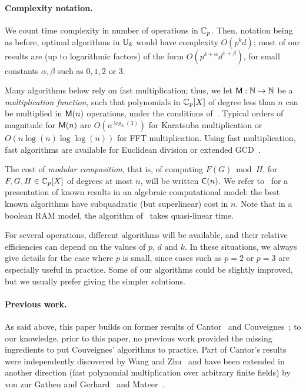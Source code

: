 \paragraph*{\bf Complexity notation.} We count time complexity
in number of operations in $\mathbb{C}_p$. Then, notation being as before,
optimal algorithms in $\mathbb{U}_k$ would have complexity $O(p^kd)$; most of
our results are (up to logarithmic factors) of the form
$O(p^{k+\alpha} d^{1+\beta})$, for small constants $\alpha,\beta$ such as
$0,1,2$ or $3$.

Many algorithms below rely on fast multiplication; thus, we let $\mathrm{\sf M}
: \mathbb{N} \rightarrow \mathbb{N}$ be a {\em multiplication function}, such that
polynomials in $\mathbb{C}_p[X]$ of degree less than $n$ can be multiplied in
$\mathrm{\sf M}(n)$ operations, under the conditions of~\cite[Ch.~8.3]{vzGG}.
Typical orders of magnitude for $\mathrm{\sf M}(n)$ are $O(n^{\log_2(3)})$ for
Karatsuba multiplication or $O(n\log (n) \log\log (n))$ for FFT
multiplication. Using fast multiplication, fast algorithms are
available for Euclidean division or extended GCD~\cite[Ch.~9 \&
11]{vzGG}.

The cost of {\em modular composition}, that is, of computing $F(G)
\bmod H$, for $F,G,H\in\mathbb{C}_p[X]$ of degrees at most $n$, will be
written $\mathrm{\sf C}(n)$. We refer to~\cite[Ch.~12]{vzGG} for a
presentation of known results in an algebraic computational model: the
best known algorithms have subquadratic (but superlinear) cost in
$n$. Note that in a boolean RAM model, the algorithm of~\cite{KeUm08}
takes quasi-linear time.

For several operations, different algorithms will be available, and
their relative efficiencies can depend on the values of $p$, $d$ and
$k$. In these situations, we always give details for the case where
$p$ is small, since cases such as $p=2$ or $p=3$ are especially useful
in practice. Some of our algorithms could be slightly
improved, but we usually prefer giving the simpler solutions.

\paragraph*{\bf Previous work.} As said above, this paper
builds on former results of Cantor~\cite{Can89} and
Couveignes~\cite{Couveignes00,Couveignes96}; to our knowledge, prior
to this paper, no previous work provided the missing ingredients to
put Couveignes' algorithms to practice. Part of Cantor's
  results were independently discovered by Wang and Zhu~\cite{WaZh88}
and have been extended in another direction (fast polynomial
multiplication over arbitrary finite fields) by von zur Gathen and
Gerhard~\cite{GaGe96} and Mateer~\cite{GaMa08}.

